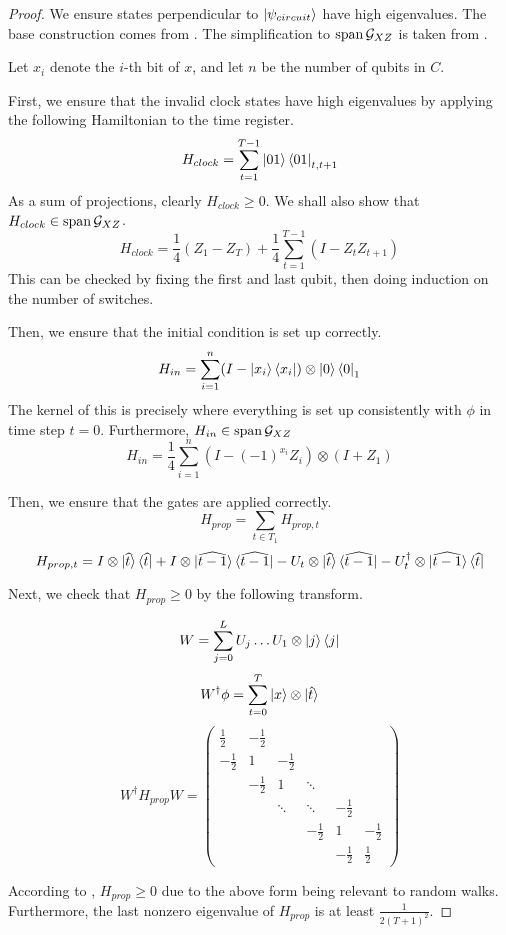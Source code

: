 \begin{proof}
	We ensure states perpendicular to $\ket{\psi_{circuit}}$ have high eigenvalues. The base construction comes from \cite{kitaev2002classical}. The simplification to $\operatorname*{\operatorname{span}}\mathcal{G}_{XZ}$ is taken from \cite{PhysRevA.78.012352}.

	Let $x_i$ denote the $i$-th bit of $x$, and let $n$ be the number of qubits in $C$.

	First, we ensure that the invalid clock states have high eigenvalues by applying the following Hamiltonian to the time register.
	$$H_{clock}=\sum_{t=1}^{T-1}\ket{01}\bra{01}_{t,t+1}$$
	As a sum of projections, clearly $H_{clock}\geq 0$. We shall also show that $H_{clock}\in\operatorname*{\operatorname{span}}\mathcal{G}_{XZ}$.
	$$H_{clock}=\frac{1}{4}(Z_1 - Z_T) + \frac{1}{4}\sum_{t=1}^{T-1}(I-Z_tZ_{t+1}) $$
	This can be checked by fixing the first and last qubit, then doing induction on the number of switches.

	Then, we ensure that the initial condition is set up correctly.
	$$H_{in}=\sum_{i=1}^n(I-\ket{x_i}\bra{x_i})\otimes\ket{0}\bra{0}_1$$
	The kernel of this is precisely where everything is set up consistently with $\phi$ in time step $t=0$. Furthermore, $H_{in}\in\operatorname*{\operatorname{span}}\mathcal{G}_{XZ}$
	$$H_{in}=\frac{1}{4}\sum_{i=1}^n(I-(-1)^{x_i}Z_i)\otimes(I+Z_1)$$

	Then, we ensure that the gates are applied correctly.
	$$H_{prop}=\sum_{t\in T_1}H_{prop,t}$$
	$$H_{prop,t}=I\otimes\ket{\widehat{t}}\bra{\widehat{t}}
	+I\otimes\ket{\widehat{t-1}}\bra{\widehat{t-1}}
	-U_t\otimes\ket{\widehat{t}}\bra{\widehat{t-1}}
	-U_t^\dagger\otimes\ket{\widehat{t-1}}\bra{\widehat{t}}$$

	Next, we check that $H_{prop}\geq0$ by the following transform.

	$$W=\sum_{j=0}^L U_j\ldots U_1\otimes\ket{j}\bra{j}$$
	$$W^\dagger\phi=\sum_{t=0}^T\ket{x}\otimes\ket{\hat{t}}$$
	$$W^\dagger H_{prop} W=
	\begin{pmatrix}
		\frac{1}{2} & -\frac{1}{2} & & & &  \\
		-\frac{1}{2} & 1 & -\frac{1}{2} & & & \\
		& -\frac{1}{2} & 1 & \ddots & & \\
		& & \ddots & \ddots & -\frac{1}{2} & \\
		& & & -\frac{1}{2} & 1 & -\frac{1}{2} \\
		& & & & -\frac{1}{2} & \frac{1}{2}
	\end{pmatrix}$$

	According to \cite{2002quant.ph.10077A}, $H_{prop}\geq 0$ due to the above form being relevant to random walks. Furthermore, the last nonzero eigenvalue of $H_{prop}$ is at least $\frac{1}{2(T+1)^2}$.


\end{proof}
